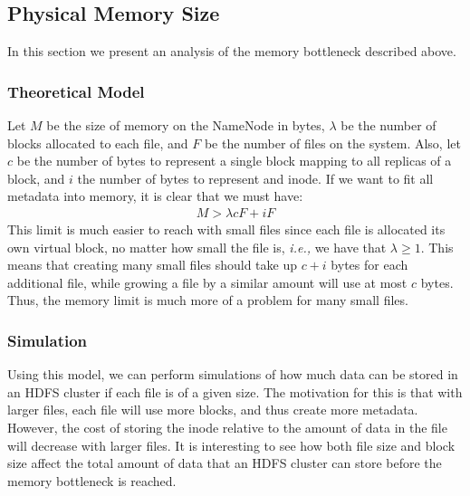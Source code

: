 \documentclass[11pt, a4paper]{article}
\begin{document}
\begin{multicols*}{2}
\subsection{Physical Memory Size}

In this section we present an analysis of the memory bottleneck described above.

\subsubsection{Theoretical Model}

Let $ M $ be the size of memory on the NameNode in bytes, $ \lambda $ be the number of blocks allocated to each file, and $ F $ be the number of files on the system. Also, let $ c $ be the number of bytes to represent a single block mapping to all replicas of a block, and $i$ the number of bytes to represent and inode. If we want to fit all metadata into memory, it is clear that we must have:
\begin{align*}
	M > \lambda c F + i F
\end{align*}
This limit is much easier to reach with small files since each file is allocated its own virtual block, no matter how small the file is, \textit{i.e.,} we have that $ \lambda \geq 1$. This means that creating many small files should take up $ c + i$ bytes for each additional file, while growing a file by a similar amount will use at most $ c $ bytes. Thus, the memory limit is much more of a problem for many small files. 
	
\subsubsection{Simulation}

Using this model, we can perform simulations of how much data can be stored in an HDFS cluster if each file is of a given size. The motivation for this is that with larger files, each file will use more blocks, and thus create more metadata. However, the cost of storing the inode relative to the amount of data in the file will decrease with larger files. It is interesting to see how both file size and block size affect the total amount of data that an HDFS cluster can store before the memory bottleneck is reached.
	

\end{multicols*}
\end{document}
